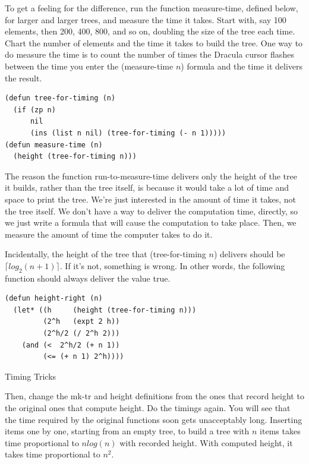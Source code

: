 To get a feeling for the difference, run the function measure-time,
defined below, for larger and larger trees, and measure the time
it takes. Start with, say 100 elements, then 200, 400, 800, and
so on, doubling the size of the tree each time.
Chart the number of elements and the time it takes to build the tree.
One way to do measure the time is to count the number of times
the Dracula cursor flashes between the time you enter the
(measure-time $n$) formula and the time it delivers the result.

\begin{center}
\begin{Verbatim}
(defun tree-for-timing (n)
  (if (zp n)
      nil
      (ins (list n nil) (tree-for-timing (- n 1)))))
(defun measure-time (n)
  (height (tree-for-timing n)))
\end{Verbatim}
\end{center}

\begin{aside}
The reason the function run-to-measure-time delivers only the height
of the tree it builds, rather than the tree itself, is
because it would take a lot of time and space to print the tree.
We're just interested in the amount of time it takes,
not the tree itself.
We don't have a way to deliver the computation time, directly,
so we just write a formula that will cause the computation to take place.
Then, we measure the amount of time the computer takes to do it.

Incidentally, the height of the tree
that (tree-for-timing $n$) delivers should be
$\lceil log_2(n+1) \rceil$. If it's not, something is wrong.
In other words, the following function should always deliver
the value true.

\begin{center}
\begin{Verbatim}
(defun height-right (n)
  (let* ((h     (height (tree-for-timing n)))
         (2^h   (expt 2 h))
         (2^h/2 (/ 2^h 2)))
    (and (<  2^h/2 (+ n 1))
         (<= (+ n 1) 2^h))))
\end{Verbatim}
\end{center}

\caption{Timing Tricks}
\label{timing-tricks}
\end{aside}

Then, change the mk-tr and height definitions from the ones
that record height to the original ones that compute height.
Do the timings again.
You will see that the time required by the original functions
soon gets unacceptably long.
Inserting items one by one, starting from an empty tree,
to build a tree with $n$ items takes time proportional to $n log(n)$
with recorded height.
With computed height, it takes time proportional to $n^2$.

